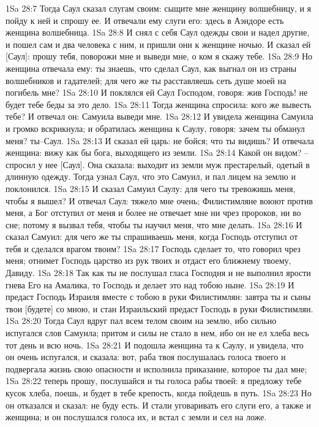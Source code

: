 1Sa 28:7  Тогда Саул сказал слугам своим: сыщите мне женщину волшебницу, и я пойду к ней и спрошу ее. И отвечали ему слуги его: здесь в Аэндоре есть женщина волшебница.
1Sa 28:8  И снял с себя Саул одежды свои и надел другие, и пошел сам и два человека с ним, и пришли они к женщине ночью. И сказал ей [Саул]: прошу тебя, поворожи мне и выведи мне, о ком я скажу тебе.
1Sa 28:9  Но женщина отвечала ему: ты знаешь, что сделал Саул, как выгнал он из страны волшебников и гадателей; для чего же ты расставляешь сеть душе моей на погибель мне?
1Sa 28:10  И поклялся ей Саул Господом, говоря: жив Господь! не будет тебе беды за это дело.
1Sa 28:11  Тогда женщина спросила: кого же вывесть тебе? И отвечал он: Самуила выведи мне.
1Sa 28:12  И увидела женщина Самуила и громко вскрикнула; и обратилась женщина к Саулу, говоря: зачем ты обманул меня? ты--Саул.
1Sa 28:13  И сказал ей царь: не бойся; что ты видишь? И отвечала женщина: вижу как бы бога, выходящего из земли.
1Sa 28:14  Какой он видом? --спросил у нее [Саул]. Она сказала: выходит из земли муж престарелый, одетый в длинную одежду. Тогда узнал Саул, что это Самуил, и пал лицем на землю и поклонился.
1Sa 28:15  И сказал Самуил Саулу: для чего ты тревожишь меня, чтобы я вышел? И отвечал Саул: тяжело мне очень; Филистимляне воюют против меня, а Бог отступил от меня и более не отвечает мне ни чрез пророков, ни во сне; потому я вызвал тебя, чтобы ты научил меня, что мне делать.
1Sa 28:16  И сказал Самуил: для чего же ты спрашиваешь меня, когда Господь отступил от тебя и сделался врагом твоим?
1Sa 28:17  Господь сделает то, что говорил чрез меня; отнимет Господь царство из рук твоих и отдаст его ближнему твоему, Давиду.
1Sa 28:18  Так как ты не послушал гласа Господня и не выполнил ярости гнева Его на Амалика, то Господь и делает это над тобою ныне.
1Sa 28:19  И предаст Господь Израиля вместе с тобою в руки Филистимлян: завтра ты и сыны твои [будете] со мною, и стан Израильский предаст Господь в руки Филистимлян.
1Sa 28:20  Тогда Саул вдруг пал всем телом своим на землю, ибо сильно испугался слов Самуила; притом и силы не стало в нем, ибо он не ел хлеба весь тот день и всю ночь.
1Sa 28:21  И подошла женщина та к Саулу, и увидела, что он очень испугался, и сказала: вот, раба твоя послушалась голоса твоего и подвергала жизнь свою опасности и исполнила приказание, которое ты дал мне;
1Sa 28:22  теперь прошу, послушайся и ты голоса рабы твоей: я предложу тебе кусок хлеба, поешь, и будет в тебе крепость, когда пойдешь в путь.
1Sa 28:23  Но он отказался и сказал: не буду есть. И стали уговаривать его слуги его, а также и женщина; и он послушался голоса их, и встал с земли и сел на ложе.
